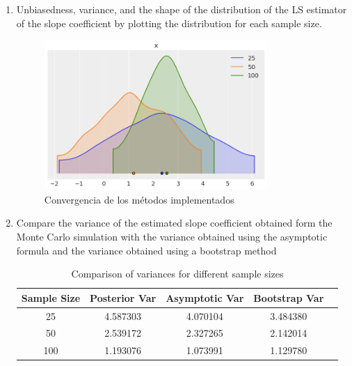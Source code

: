\documentclass{article}
\begin{document}
\begin{enumerate}
  \item Unbiasedness, variance, and the shape of the distribution of the LS estimator of the slope 
    coefficient by plotting the distribution for each sample size. 
    \begin{figure}[H]
	\centering
	\includegraphics[width=0.8\textwidth]{assets/output.png}
	\caption{Convergencia de los métodos implementados}
\end{figure}
  \item Compare the variance of the estimated slope coefficient obtained form the Monte Carlo simulation with 
    the variance obtained using the asymptotic formula and the variance obtained using a bootstrap method 
    \begin{table}[h]
\centering
\begin{tabular}{c c c c c}
\hline
\textbf{Sample Size} & \textbf{Posterior Var} & \textbf{Asymptotic Var} & \textbf{Bootstrap Var} \\
\hline
25  & 4.587303 & 4.070104 & 3.484380 \\
50  & 2.539172 & 2.327265 & 2.142014 \\
100 & 1.193076 & 1.073991 & 1.129780 \\
\hline
\end{tabular}
\caption{Comparison of variances for different sample sizes}
\label{tab:variance_comparison}
\end{table}

\end{enumerate}
  \begin{pythonbox}
	\inputminted{python}{code/reg5.py}
\end{pythonbox}
\end{document}
